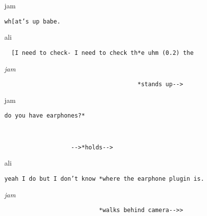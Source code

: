\documentclass[output=paper,nonflat,modfont,draft]{langsci/langscibook}
\begin{document}

\begin{transbox}{13}{jam}
\begin{verbatim}
wh[at’s up babe.
\end{verbatim}
\end{transbox}

\begin{mdframedkendrick}[style=firstfoc]
\begin{transbox}{14}{ali}
\begin{verbatim}
  [I need to check- I need to check th*e uhm (0.2) the
\end{verbatim}
\end{transbox}
\end{mdframedkendrick}\vspace{-5mm}

\begin{mdframedkendrick}[style=secondfoc]
\begin{transbox}{15}{\textit{jam}}
\begin{verbatim}
                                      *stands up-->
\end{verbatim}
\end{transbox}
\end{mdframedkendrick}\vspace{-5mm}



\begin{transbox}{18}{jam}
\begin{verbatim}
do you have earphones?*
\end{verbatim}
\end{transbox}

\begin{transbox}{19}{~}
\begin{verbatim}
                   -->*holds-->
\end{verbatim}
\end{transbox}


\begin{transbox}{21}{ali}
\begin{verbatim}
yeah I do but I don’t know *where the earphone plugin is.
\end{verbatim}
\end{transbox}

\begin{transbox}{22}{\textit{jam}}
\begin{verbatim}
                           *walks behind camera-->>
\end{verbatim}
\end{transbox}
\end{document}

